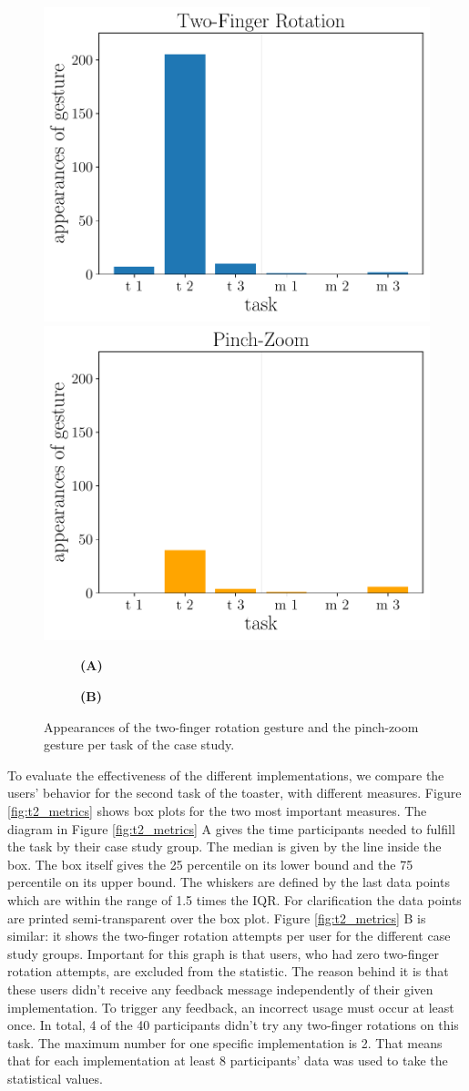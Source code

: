 \documentclass[11pt, a4paper]{article}
\begin{document}
			\begin{figure}[H]
				\centering
				\includegraphics[width=.49\textwidth]{img/plot/plot_tfr.pdf}
				\includegraphics[width=.49\textwidth]{img/plot/plot_pz.pdf}
				\begin{subfigure}[t]{.49\textwidth}\centering
					\textbf{(A)}
				\end{subfigure}
				\begin{subfigure}[t]{.49\textwidth}\centering
					\textbf{(B)}
				\end{subfigure}
				\caption{Appearances of the two-finger rotation gesture and the pinch-zoom gesture per task of the case study. }
				\label{fig:tfr_v_pz}
			\end{figure}

			To evaluate the effectiveness of the different implementations, we compare the users' behavior for the second task of the toaster, with different measures. Figure \ref{fig:t2_metrics} shows box plots for the two most important measures. The diagram in Figure \ref{fig:t2_metrics} A gives the time participants needed to fulfill the task by their case study group. The median is given by the line inside the box. The box itself gives the 25 percentile on its lower bound and the 75 percentile on its upper bound. The whiskers are defined by the last data points which are within the range of 1.5 times the IQR. For clarification the data points are printed semi-transparent over the box plot. Figure \ref{fig:t2_metrics} B is similar: it shows the two-finger rotation attempts per user for the different case study groups. Important for this graph is that users, who had zero two-finger rotation attempts, are excluded from the statistic. The reason behind it is that these users didn't receive any feedback message independently of their given implementation. To trigger any feedback, an incorrect usage must occur at least once. In total, 4 of the 40 participants didn't try any two-finger rotations on this task. The maximum number for one specific implementation is 2. That means that for each implementation at least 8 participants' data was used to take the statistical values.
\end{document}
